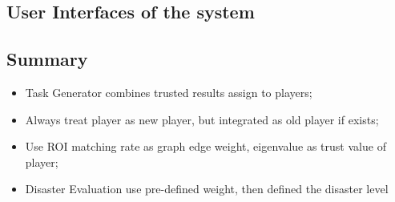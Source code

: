 \subsection{User Interfaces of the system}
\subsection{Summary}

    \begin{itemize}
      \item Task Generator combines trusted results assign to players;
      \item Always treat player as new player, but integrated as old player if exists;
      \item Use ROI matching rate as graph edge weight, eigenvalue as trust value of player;
      \item Disaster Evaluation use pre-defined weight, then defined the disaster level
    \end{itemize}

